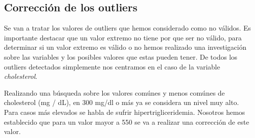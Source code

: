 \documentclass[
]{article}
\newenvironment{Shaded}{\begin{snugshade}}{\end{snugshade}}
\newcommand{\AttributeTok}[1]{\textcolor[rgb]{0.77,0.63,0.00}{#1}}
\newcommand{\CommentTok}[1]{\textcolor[rgb]{0.56,0.35,0.01}{\textit{#1}}}
\newcommand{\ConstantTok}[1]{\textcolor[rgb]{0.00,0.00,0.00}{#1}}
\newcommand{\DecValTok}[1]{\textcolor[rgb]{0.00,0.00,0.81}{#1}}
\newcommand{\FunctionTok}[1]{\textcolor[rgb]{0.00,0.00,0.00}{#1}}
\newcommand{\NormalTok}[1]{#1}
\newcommand{\OtherTok}[1]{\textcolor[rgb]{0.56,0.35,0.01}{#1}}
\newcommand{\SpecialCharTok}[1]{\textcolor[rgb]{0.00,0.00,0.00}{#1}}
\newcommand{\StringTok}[1]{\textcolor[rgb]{0.31,0.60,0.02}{#1}}
\begin{document}
\hypertarget{correcciuxf3n-de-los-outliers}{%
\subsection{Corrección de los
outliers}\label{correcciuxf3n-de-los-outliers}}

Se van a tratar los valores de outliers que hemos considerado como no
válidos. Es importante destacar que un valor extremo no tiene por que
ser no válido, para determinar si un valor extremo es válido o no hemos
realizado una investigación sobre las variables y los posibles valores
que estas pueden tener. De todos los outliers detectados simplemente nos
centramos en el caso de la variable \emph{cholesterol}.

Realizando una búsqueda sobre los valores comúnes y menos comúnes de
cholesterol (mg / dL), en 300 mg/dl o más ya se considera un nivel muy
alto. Para casos más elevados se habla de sufrir hipertrigliceridemia.
Nosotros hemos establecido que para un valor mayor a 550 se va a
realizar una corrección de este valor.

\begin{Shaded}
\end{Shaded}
\end{document}
